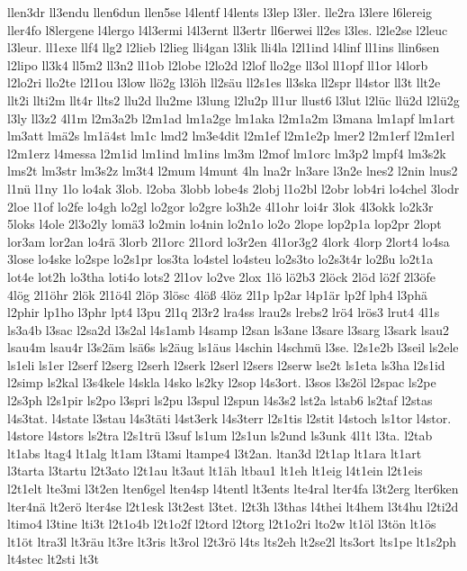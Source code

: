 {llen3dr
ll3endu
llen6dun
llen5se
l4lentf
l4lents
l3lep
l3ler.
lle2ra
l3lere
l6lereig
ller4fo
l8lergene
l4lergo
l4l3ermi
l4l3ernt
ll3ertr
ll6erwei
ll2es
l3les.
l2le2se
l2leuc
l3leur.
ll1exe
llf4
llg2
l2lieb
l2lieg
lli4gan
l3lik
lli4la
l2l1ind
l4linf
ll1ins
llin6sen
l2lipo
ll3k4
ll5m2
ll3n2
ll1ob
l2lobe
l2lo2d
l2lof
llo2ge
ll3ol
ll1opf
ll1or
l4lorb
l2lo2ri
llo2te
l2l1ou
l3low
llö2g
l3löh
ll2säu
ll2s1es
ll3ska
ll2spr
ll4stor
ll3t
llt2e
llt2i
llti2m
llt4r
llts2
llu2d
llu2me
l3lung
l2lu2p
ll1ur
llust6
l3lut
l2lüc
llü2d
l2lü2g
l3ly
ll3z2
4l1m
l2m3a2b
l2m1ad
lm1a2ge
lm1aka
l2m1a2m
l3mana
lm1apf
lm1art
lm3att
lmä2s
lm1ä4st
lm1c
lmd2
lm3e4dit
l2m1ef
l2m1e2p
lmer2
l2m1erf
l2m1erl
l2m1erz
l4messa
l2m1id
lm1ind
lm1ins
lm3m
l2mof
lm1orc
lm3p2
lmpf4
lm3s2k
lms2t
lm3str
lm3s2z
lm3t4
l2mum
l4munt
4ln
lna2r
ln3are
l3n2e
lnes2
l2nin
lnus2
l1nü
l1ny
1lo
lo4ak
3lob.
l2oba
3lobb
lobe4s
2lobj
l1o2bl
l2obr
lob4ri
lo4chel
3lodr
2loe
l1of
lo2fe
lo4gh
lo2gl
lo2gor
lo2gre
lo3h2e
4l1ohr
loi4r
3lok
4l3okk
lo2k3r
5loks
l4ole
2l3o2ly
lomä3
lo2min
lo4nin
lo2n1o
lo2o
2lope
lop2p1a
lop2pr
2lopt
lor3am
lor2an
lo4rä
3lorb
2l1orc
2l1ord
lo3r2en
4l1or3g2
4lork
4lorp
2lort4
lo4sa
3lose
lo4ske
lo2spe
lo2s1pr
los3ta
lo4stel
lo4steu
lo2s3to
lo2s3t4r
lo2ßu
lo2t1a
lot4e
lot2h
lo3tha
loti4o
lots2
2l1ov
lo2ve
2lox
1lö
lö2b3
2löck
2löd
lö2f
2l3öfe
4lög
2l1öhr
2lök
2l1ö4l
2löp
3lösc
4löß
4löz
2l1p
lp2ar
l4p1är
lp2f
lph4
l3phä
l2phir
lp1ho
l3phr
lpt4
l3pu
2l1q
2l3r2
lra4ss
lrau2s
lrebs2
lrö4
lrös3
lrut4
4l1s
ls3a4b
l3sac
l2sa2d
l3s2al
l4s1amb
l4samp
l2san
ls3ane
l3sare
l3sarg
l3sark
lsau2
lsau4m
lsau4r
l3s2äm
lsä6s
ls2äug
ls1äus
l4schin
l4schmü
l3se.
l2s1e2b
l3seil
ls2ele
ls1eli
ls1er
l2serf
l2serg
l2serh
l2serk
l2serl
l2sers
l2serw
lse2t
ls1eta
ls3ha
l2s1id
l2simp
ls2kal
l3s4kele
l4skla
l4sko
ls2ky
l2sop
l4s3ort.
l3sos
l3s2öl
l2spac
ls2pe
l2s3ph
l2s1pir
ls2po
l3spri
ls2pu
l3spul
l2spun
l4s3s2
lst2a
lstab6
ls2taf
l2stas
l4s3tat.
l4state
l3stau
l4s3täti
l4st3erk
l4s3terr
l2s1tis
l2stit
l4stoch
ls1tor
l4stor.
l4store
l4stors
ls2tra
l2s1trü
l3suf
ls1um
l2s1un
ls2und
ls3unk
4l1t
l3ta.
l2tab
lt1abs
ltag4
lt1alg
lt1am
l3tami
ltampe4
l3t2an.
ltan3d
l2t1ap
lt1ara
lt1art
l3tarta
l3tartu
l2t3ato
l2t1au
lt3aut
lt1äh
ltbau1
lt1eh
lt1eig
l4t1ein
l2t1eis
l2t1elt
lte3mi
l3t2en
lten6gel
lten4sp
l4tentl
lt3ents
lte4ral
lter4fa
l3t2erg
lter6ken
lter4nä
lt2erö
lter4se
l2t1esk
l3t2est
l3tet.
l2t3h
l3thas
l4thei
lt4hem
l3t4hu
l2ti2d
ltimo4
l3tine
lti3t
l2t1o4b
l2t1o2f
l2tord
l2torg
l2t1o2ri
lto2w
lt1öl
l3tön
lt1ös
lt1öt
ltra3l
lt3räu
lt3re
lt3ris
lt3rol
l2t3rö
l4ts
lts2eh
lt2se2l
lts3ort
lts1pe
lt1s2ph
lt4stec
lt2sti
lt3t
}
